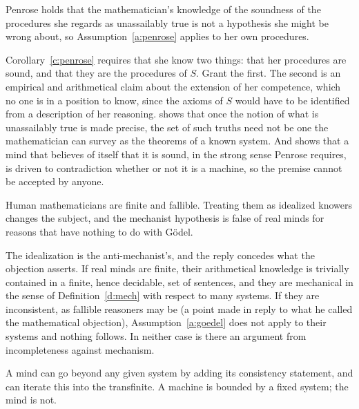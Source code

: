 \documentclass{situationist-preprint}
\begin{document}
\begin{objection}
Penrose holds that the mathematician's knowledge of the soundness of the procedures she regards as unassailably true is not a hypothesis she might be wrong about, so Assumption~\ref{a:penrose} applies to her own procedures.
\end{objection}

\begin{reply}
Corollary~\ref{c:penrose} requires that she know two things: that her procedures are sound, and that they are the procedures of $S$. Grant the first. The second is an empirical and arithmetical claim about the extension of her competence, which no one is in a position to know, since the axioms of $S$ would have to be identified from a description of her reasoning. \citet{Shapiro1998} shows that once the notion of what is unassailably true is made precise, the set of such truths need not be one the mathematician can survey as the theorems of a known system. And \citet{Chalmers1995} shows that a mind that believes of itself that it is sound, in the strong sense Penrose requires, is driven to contradiction whether or not it is a machine, so the premise cannot be accepted by anyone.
\end{reply}

\begin{objection}[Idealization]
Human mathematicians are finite and fallible. Treating them as idealized knowers changes the subject, and the mechanist hypothesis is false of real minds for reasons that have nothing to do with G\"odel.
\end{objection}

\begin{reply}
The idealization is the anti-mechanist's, and the reply concedes what the objection asserts. If real minds are finite, their arithmetical knowledge is trivially contained in a finite, hence decidable, set of sentences, and they are mechanical in the sense of Definition~\ref{d:mech} with respect to many systems. If they are inconsistent, as fallible reasoners may be (a point \citet{Turing1950} made in reply to what he called the mathematical objection), Assumption~\ref{a:goedel} does not apply to their systems and nothing follows. In neither case is there an argument from incompleteness against mechanism.
\end{reply}

\begin{objection}
A mind can go beyond any given system by adding its consistency statement, and can iterate this into the transfinite. A machine is bounded by a fixed system; the mind is not.
\end{objection}
\end{document}
